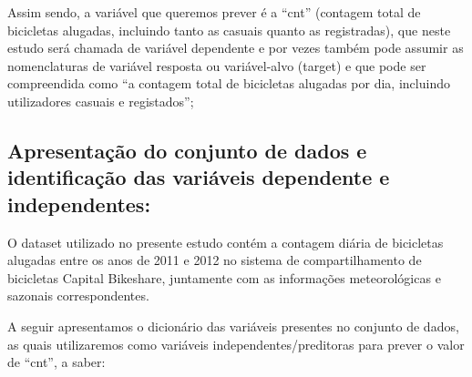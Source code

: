 \documentclass[
  letterpaper,
  DIV=11,
  numbers=noendperiod]{scrartcl}
\begin{document}
Assim sendo, a variável que queremos prever é a ``cnt'' (contagem total
de bicicletas alugadas, incluindo tanto as casuais quanto as
registradas), que neste estudo será chamada de variável dependente e por
vezes também pode assumir as nomenclaturas de variável resposta ou
variável-alvo (target) e que pode ser compreendida como ``a contagem
total de bicicletas alugadas por dia, incluindo utilizadores casuais e
registados'';

\subsection{Apresentação do conjunto de dados e identificação das
variáveis dependente e
independentes:}\label{apresentauxe7uxe3o-do-conjunto-de-dados-e-identificauxe7uxe3o-das-variuxe1veis-dependente-e-independentes}

O dataset utilizado no presente estudo contém a contagem diária de
bicicletas alugadas entre os anos de 2011 e 2012 no sistema de
compartilhamento de bicicletas Capital Bikeshare, juntamente com as
informações meteorológicas e sazonais correspondentes.

A seguir apresentamos o dicionário das variáveis presentes no conjunto
de dados, as quais utilizaremos como variáveis independentes/preditoras
para prever o valor de ``cnt'', a saber:
\end{document}
